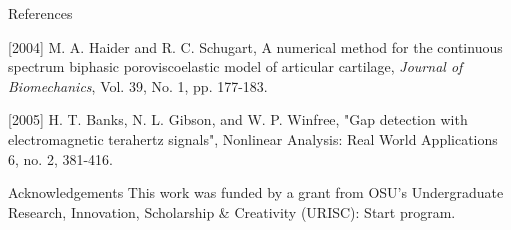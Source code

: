\documentclass[final]{beamer} %
\begin{document}
\begin{frame}[t]
\begin{columns}[t]
\begin{column}{0.28\paperwidth}
\begin{block}{References}
\begin{thebibliography}{7}
{[2004] M. A. Haider and R. C. Schugart, A numerical method for the continuous spectrum biphasic poroviscoelastic model of articular cartilage, {\em Journal of Biomechanics}, Vol. 39, No. 1, pp. 177-183.

[2005] H. T. Banks, N. L. Gibson, and W. P. Winfree, "Gap detection with electromagnetic terahertz signals", Nonlinear Analysis: Real World Applications 6, no. 2, 381-416.
}
\end{thebibliography}
\end{block}

\begin{block}{Acknowledgements}
This work was funded by a grant from OSU's Undergraduate Research, Innovation, Scholarship \& Creativity (URISC): Start program.
\end{block}
\end{column}
\end{columns}

\end{frame}
\end{document}
